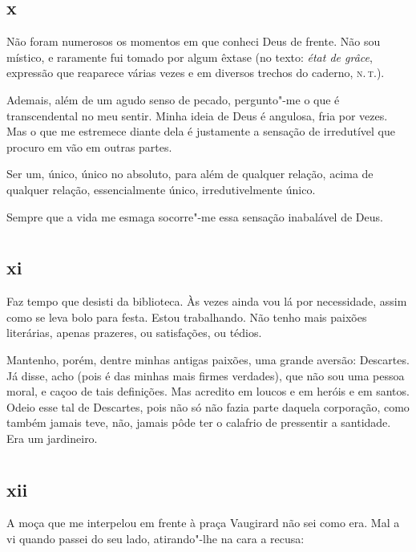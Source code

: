 \section{x}

\noindent{}Não foram numerosos os momentos em que conheci Deus de frente. Não sou
místico, e raramente fui tomado por algum êxtase (no texto: \textit{état
de grâce}, expressão que reaparece várias vezes e em diversos trechos do
caderno, \textsc{n.\,t.}).

Ademais, além de um agudo senso de pecado, pergunto"-me o que é
transcendental no meu sentir. Minha ideia de Deus é angulosa, fria por
vezes. Mas o que me estremece diante dela é justamente a sensação de
irredutível que procuro em vão em outras partes.

Ser um, único, único no absoluto, para além de qualquer relação, acima
de qualquer relação, essencialmente único, irredutivelmente único.

Sempre que a vida me esmaga socorre"-me essa sensação inabalável de Deus.

\chapter*{}
\section{xi}

\noindent{}Faz tempo que desisti da biblioteca. Às vezes ainda vou lá por
necessidade, assim como se leva bolo para festa. Estou trabalhando. Não
tenho mais paixões literárias, apenas prazeres, ou satisfações, ou
tédios.

Mantenho, porém, dentre minhas antigas paixões, uma grande aversão:
Descartes.
Já disse, acho (pois é das minhas mais firmes verdades), que não
sou uma pessoa moral, e caçoo de tais definições. Mas acredito em loucos
e em heróis e em santos. Odeio esse tal de Descartes, pois não só
não fazia parte daquela corporação, como também jamais teve, não, jamais
pôde ter o calafrio de pressentir a santidade. Era um jardineiro.

\chapter*{}
\section{xii}

\noindent{}A moça que me interpelou em frente à praça Vaugirard não sei como era.
Mal a vi quando passei do seu lado, atirando"-lhe na cara a recusa:


